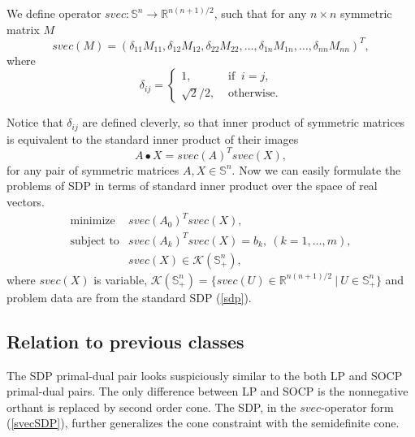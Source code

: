 \documentclass[12pt]{book}
\theoremstyle{definition}
\begin{document}
 \label{svec}
We define operator $svec: \mathbb{S}^n \rightarrow \mathbb{R}^{n(n+1)/2}$, such that for any $n\times n$ symmetric matrix $M$
\begin{equation}
	svec(M) = ( \delta_{11}M_{11},\delta_{12}M_{12},\delta_{22}M_{22},\dots ,\delta_{1n}M_{1n},\dots ,\delta_{nn}M_{nn})^T,
\end{equation}
where
\begin{equation}
	\delta_{ij}= \left\lbrace 
	\begin{array}{ll} 
		1, &\mbox{ if }\ i=j, \\ 
		\sqrt{2}/2, &\mbox{ otherwise.} 
	\end{array} \right.
\end{equation}

Notice that $\delta_{ij}$ are defined cleverly, so that inner product of symmetric matrices is equivalent to the standard inner product of their images
\begin{equation}
A\bullet X= svec(A)^Tsvec(X), 
\end{equation}
for any pair of symmetric matrices $A,X\in \mathbb{S}^n.$  Now we can easily formulate the problems of SDP in terms of standard inner product over the space of real vectors. 
\begin{equation}
\label{svecSDP}
\begin{array}{ll}
\mbox{minimize} & svec(A_0)^T svec(X),\\
\mbox{subject to}& svec(A_k)^T svec(X)  = b_k, \ (k = 1,\dots ,m), \\
& svec(X) \in \mathcal{K}(\mathbb{S}^n_+),
\end{array}
\end{equation}
where $svec(X)$ is variable,  $\mathcal{K}(\mathbb{S}^n_+) = \{svec(U)\in \mathbb{R}^{n(n+1)/2}\ |\ U\in \mathbb{S}^n_+\}$ 
and problem data are from the standard SDP (\ref{sdp}).


\subsection{Relation to previous classes}
The  SDP primal-dual pair looks suspiciously similar to the both LP and SOCP primal-dual pairs. 
The only difference between LP and SOCP is the nonnegative orthant is replaced by second order cone. 
The SDP, in the $svec$-operator form (\ref{svecSDP}), further generalizes the cone constraint with the semidefinite cone.
\end{document}
